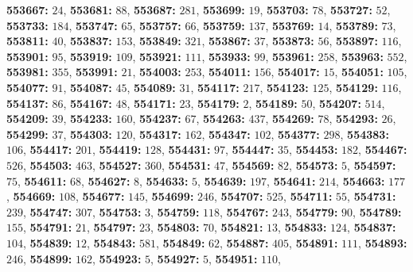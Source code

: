 \textsf{\bfseries 553667:} $24$, \textsf{\bfseries 553681:} $88$, \textsf{\bfseries 553687:} $281$, \textsf{\bfseries 553699:} $19$, \textsf{\bfseries 553703:} $78$, \textsf{\bfseries 553727:} $52$, \textsf{\bfseries 553733:} $184$, \textsf{\bfseries 553747:} $65$, \textsf{\bfseries 553757:} $66$, \textsf{\bfseries 553759:} $137$, \textsf{\bfseries 553769:} $14$, \textsf{\bfseries 553789:} $73$, \textsf{\bfseries 553811:} $40$, \textsf{\bfseries 553837:} $153$, \textsf{\bfseries 553849:} $321$, \textsf{\bfseries 553867:} $37$, \textsf{\bfseries 553873:} $56$, \textsf{\bfseries 553897:} $116$, \textsf{\bfseries 553901:} $95$, \textsf{\bfseries 553919:} $109$, \textsf{\bfseries 553921:} $111$, \textsf{\bfseries 553933:} $99$, \textsf{\bfseries 553961:} $258$, \textsf{\bfseries 553963:} $552$, \textsf{\bfseries 553981:} $355$, \textsf{\bfseries 553991:} $21$, \textsf{\bfseries 554003:} $253$, \textsf{\bfseries 554011:} $156$, \textsf{\bfseries 554017:} $15$, \textsf{\bfseries 554051:} $105$, \textsf{\bfseries 554077:} $91$, \textsf{\bfseries 554087:} $45$, \textsf{\bfseries 554089:} $31$, \textsf{\bfseries 554117:} $217$, \textsf{\bfseries 554123:} $125$, \textsf{\bfseries 554129:} $116$, \textsf{\bfseries 554137:} $86$, \textsf{\bfseries 554167:} $48$, \textsf{\bfseries 554171:} $23$, \textsf{\bfseries 554179:} $2$, \textsf{\bfseries 554189:} $50$, \textsf{\bfseries 554207:} $514$, \textsf{\bfseries 554209:} $39$, \textsf{\bfseries 554233:} $160$, \textsf{\bfseries 554237:} $67$, \textsf{\bfseries 554263:} $437$, \textsf{\bfseries 554269:} $78$, \textsf{\bfseries 554293:} $26$, \textsf{\bfseries 554299:} $37$, \textsf{\bfseries 554303:} $120$, \textsf{\bfseries 554317:} $162$, \textsf{\bfseries 554347:} $102$, \textsf{\bfseries 554377:} $298$, \textsf{\bfseries 554383:} $106$, \textsf{\bfseries 554417:} $201$, \textsf{\bfseries 554419:} $128$, \textsf{\bfseries 554431:} $97$, \textsf{\bfseries 554447:} $35$, \textsf{\bfseries 554453:} $182$, \textsf{\bfseries 554467:} $526$, \textsf{\bfseries 554503:} $463$, \textsf{\bfseries 554527:} $360$, \textsf{\bfseries 554531:} $47$, \textsf{\bfseries 554569:} $82$, \textsf{\bfseries 554573:} $5$, \textsf{\bfseries 554597:} $75$, \textsf{\bfseries 554611:} $68$, \textsf{\bfseries 554627:} $8$, \textsf{\bfseries 554633:} $5$, \textsf{\bfseries 554639:} $197$, \textsf{\bfseries 554641:} $214$, \textsf{\bfseries 554663:} $177$, \textsf{\bfseries 554669:} $108$, \textsf{\bfseries 554677:} $145$, \textsf{\bfseries 554699:} $246$, \textsf{\bfseries 554707:} $525$, \textsf{\bfseries 554711:} $55$, \textsf{\bfseries 554731:} $239$, \textsf{\bfseries 554747:} $307$, \textsf{\bfseries 554753:} $3$, \textsf{\bfseries 554759:} $118$, \textsf{\bfseries 554767:} $243$, \textsf{\bfseries 554779:} $90$, \textsf{\bfseries 554789:} $155$, \textsf{\bfseries 554791:} $21$, \textsf{\bfseries 554797:} $23$, \textsf{\bfseries 554803:} $70$, \textsf{\bfseries 554821:} $13$, \textsf{\bfseries 554833:} $124$, \textsf{\bfseries 554837:} $104$, \textsf{\bfseries 554839:} $12$, \textsf{\bfseries 554843:} $581$, \textsf{\bfseries 554849:} $62$, \textsf{\bfseries 554887:} $405$, \textsf{\bfseries 554891:} $111$, \textsf{\bfseries 554893:} $246$, \textsf{\bfseries 554899:} $162$, \textsf{\bfseries 554923:} $5$, \textsf{\bfseries 554927:} $5$, \textsf{\bfseries 554951:} $110$, 
